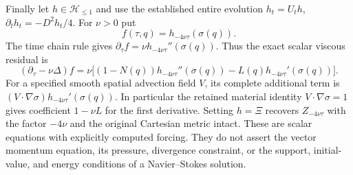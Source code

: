 Finally let $h\in\mathcal H_{\le1}$ and use the established entire
evolution $h_t=U_th$, $\partial_th_t=-D^2h_t/4$. For $\nu>0$ put
\[
 f(\tau,q)=h_{-4\nu\tau}(\sigma(q)).
\]
The time chain rule gives
$\partial_\tau f=\nu h_{-4\nu\tau}''(\sigma(q))$.
Thus the exact scalar viscous residual is
\begin{equation}
 (\partial_\tau-\nu\Delta)f
 =\nu\bigl[(1-N(q))h_{-4\nu\tau}''(\sigma(q))
          -L(q)h_{-4\nu\tau}'(\sigma(q))\bigr].
 \label{eq:cq-spatial-viscous-residual}
\end{equation}
For a specified smooth spatial advection field $V$, its complete
additional term is
$(V\cdot\nabla\sigma)h_{-4\nu\tau}'(\sigma(q))$.
In particular the retained material identity $V\cdot\nabla\sigma=1$
gives coefficient $1-\nu L$ for the first derivative.
Setting $h=\Xi$ recovers $Z_{-4\nu\tau}$ with the factor $-4\nu$
and the original Cartesian metric intact. These are scalar equations
with explicitly computed forcing. They do not assert the vector
momentum equation, its pressure, divergence constraint, or the support,
initial-value, and energy conditions of a Navier--Stokes solution.
